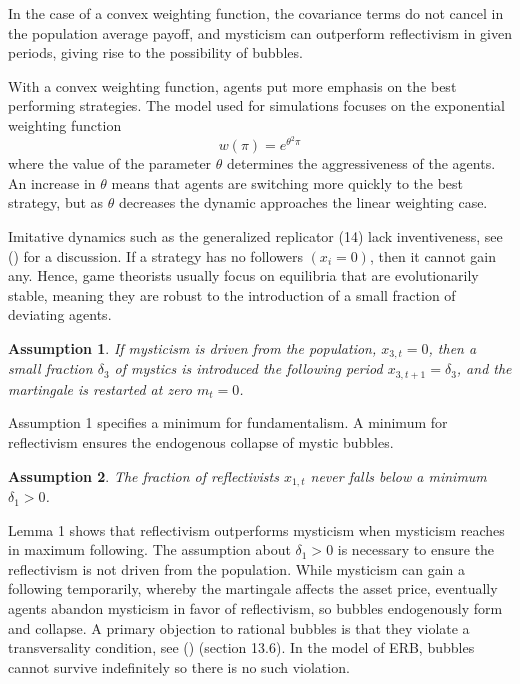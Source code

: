 \documentclass[12pt]{article}
\newtheorem{assumption}{Assumption}
\begin{document}
In the case of a convex weighting function, the covariance terms do not cancel in the population average payoff, and mysticism can outperform reflectivism in given periods, giving rise to the possibility of bubbles.

With a convex weighting function, agents put more emphasis on the best performing strategies. The model used for simulations focuses on the exponential weighting function
\begin{equation}
w(\pi)=e^{\theta^{2} \pi} \label{w}
\end{equation}
where the value of the parameter $\theta$ determines the aggressiveness of the agents. An increase in $\theta$ means that agents are switching more quickly to the best strategy, but as $\theta$ decreases the dynamic approaches the linear weighting case.

Imitative dynamics such as the generalized replicator (14) lack inventiveness, see \citeauthor{waters2009chaos} (\citeyear{waters2009chaos}) for a discussion. If a strategy has no followers $\left(x_{i}=0\right)$, then it cannot gain any. Hence, game theorists usually focus on equilibria that are evolutionarily stable, meaning they are robust to the introduction of a small fraction of deviating agents.

\begin{assumption} If mysticism is driven from the population, $x_{3,t}=0$, then a small fraction $\delta_{3}$ of mystics is introduced the following period $x_{3,t+1}=\delta_{3}$, and the martingale is restarted at zero $m_{t}=0$.
\end{assumption}
Assumption 1 specifies a minimum for fundamentalism. A minimum for reflectivism ensures the endogenous collapse of mystic bubbles.

\begin{assumption} The fraction of reflectivists $x_{1, t}$ never falls below a minimum $\delta_{1}>0$.
\end{assumption}
Lemma 1 shows that reflectivism outperforms mysticism when mysticism reaches in maximum following. The assumption about $\delta_{1}>0$ is necessary to ensure the reflectivism is not driven from the population. While mysticism can gain a following temporarily, whereby the martingale affects the asset price, eventually agents abandon mysticism in favor of reflectivism, so bubbles endogenously form and collapse. A primary objection to rational bubbles is that they violate a transversality condition, see \citeauthor{ljungqvist2018recursive} (\citeyear{ljungqvist2018recursive}) (section 13.6). In the model of ERB, bubbles cannot survive indefinitely so there is no such violation.
\end{document}
